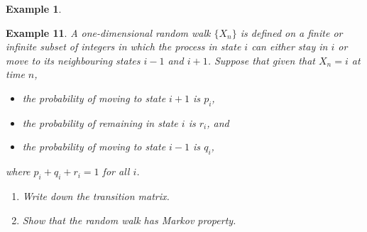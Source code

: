 \documentclass[
]{book}
\theoremstyle{definition}
\theoremstyle{definition}
\newtheorem{example}{Example}[chapter]
\theoremstyle{definition}
\theoremstyle{definition}
\theoremstyle{remark}
\begin{document}
\begin{example}
\protect\hypertarget{exm:unlabeled-div-20}{}\label{exm:unlabeled-div-20}

\textbf{Example 11}. \emph{A one-dimensional random walk \(\{X_n\}\) is defined on a
finite or infinite subset of integers in which the process in state \(i\)
can either stay in \(i\) or move to its neighbouring states \(i -1\) and
\(i+1\). Suppose that given that \(X_n = i\) at time \(n\),}

\begin{itemize}
\item
  \emph{the probability of moving to state \(i+1\) is \(p_i\),}
\item
  \emph{the probability of remaining in state \(i\) is \(r_i\), and}
\item
  \emph{the probability of moving to state \(i-1\) is \(q_i\),}
\end{itemize}

\emph{where \(p_i + q_i + r_i = 1\) for all \(i\).}

\begin{enumerate}
\def\labelenumi{\arabic{enumi}.}
\item
  \emph{Write down the transition matrix.}
\item
  \emph{Show that the random walk has Markov property.}
\end{enumerate}

\end{example}
\end{document}
